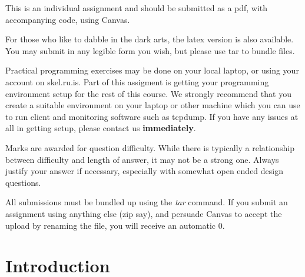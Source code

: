\documentclass[9pt, addpoints]{exam}
\begin{document}
\large     
\vspace{2cm}
\begin{center}
    \begin{minipage}{40em}
        \begin{center}
            This is an individual assignment and should be submitted as a pdf, with accompanying code, using Canvas.  
        \end{center}
        
        \vspace{6pt}
    For those who like to dabble in the dark arts, the latex version 
    is also available. You may submit in any legible form you wish, but please
    use tar to bundle files.
    
        \vspace{6pt}
    Practical programming exercises may be done on your local laptop, or
    using your account on skel.ru.is. Part of this assigment is getting your
    programming environment setup for the rest of this course. We strongly recommend that you
    create a suitable environment on your laptop or other machine which
    you can use to run client and monitoring software such as tcpdump.
    If you have any issues at all in getting setup, please contact 
    us \textbf{immediately}.

        \vspace{6pt}
    Marks are awarded for question difficulty. While there is 
    typically a relationship between difficulty and length of answer,
    it may not be a strong one. Always justify your answer if necessary,
    especially with somewhat open ended design questions.

    \vspace{6pt}
    All submissions must be bundled up using the \emph{tar} command. If you 
    submit an assignment using anything else (zip say), and persuade Canvas
    to accept the upload by renaming the file, you will receive an automatic
    0.

    \end{minipage}
\end{center}

\vspace{4cm}
\begin{center}
    \gradetable[h]
\end{center}
\newpage
\section*{Introduction}
\end{document}
